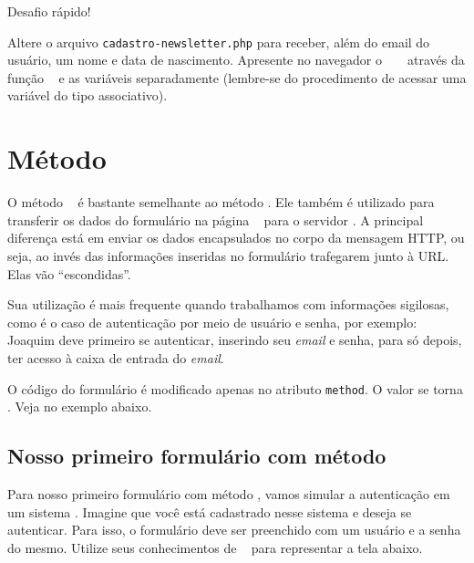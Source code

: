 \begin{framed}
{\Large Desafio rápido!}

Altere o arquivo \texttt{cadastro-newsletter.php} para receber, além do email do 
usuário, um nome e data de nascimento. Apresente no navegador  
o \tipoarray~ \variavelget~ através da função \funcaoprintr~ e as variáveis
separadamente (lembre-se do procedimento de acessar uma variável do tipo \tipoarray
associativo).
\end{framed}

\section{Método \metodoPOST}
\label{metodo-post}

O método \metodoPOST~ é bastante semelhante ao método \metodoGET. Ele também é utilizado
para transferir os dados do formulário na página \html~ para o servidor \php. A principal
diferença está em enviar os dados encapsulados no corpo da mensagem HTTP, ou seja,
ao invés das informações inseridas no formulário trafegarem junto à URL. Elas vão
``escondidas''. 

Sua utilização é mais frequente quando trabalhamos com informações sigilosas, como é o caso
de autenticação por meio de usuário e senha, por exemplo: Joaquim deve primeiro se autenticar,
inserindo seu \textit{email} e senha, para só depois, ter acesso à caixa de entrada do \textit{email}.

O código do formulário é modificado apenas no atributo \texttt{method}. O valor se torna
\metodoPOST. Veja no exemplo abaixo.



\subsection{Nosso primeiro formulário com método \metodoPOST}
\label{nosso-primeiro-formulario-com-metodo-post}

Para nosso primeiro formulário com método \metodoPOST, vamos simular a autenticação em um 
sistema \web. Imagine que você está cadastrado nesse sistema e deseja se autenticar. 
Para isso, o formulário deve ser preenchido com um usuário e a senha do mesmo.
Utilize seus conhecimentos de \html~ para representar a tela abaixo.


